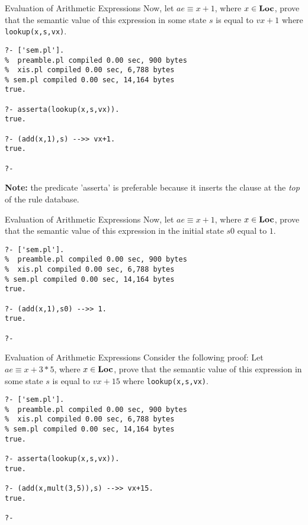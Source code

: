 \documentclass{beamer}
\begin{document}
\begin{frame}[fragile]{Evaluation of Arithmetic Expressions}
\small
Now, let $ae \equiv x + 1$, where $x \in \mbox{\bf Loc}$, prove that the semantic value of this expression in some
state $s$ is equal to $vx +1$ where {\tt lookup(x,s,vx)}.

\begin{verbatim}
?- ['sem.pl'].
%  preamble.pl compiled 0.00 sec, 900 bytes
%  xis.pl compiled 0.00 sec, 6,788 bytes
% sem.pl compiled 0.00 sec, 14,164 bytes
true.

?- asserta(lookup(x,s,vx)).
true.

?- (add(x,1),s) -->> vx+1. 
true.

?- 
\end{verbatim}

{\bf Note:} the predicate 'asserta' is preferable because it inserts the clause at the {\em top} of the rule database.
\end{frame}

\begin{frame}[fragile]{Evaluation of Arithmetic Expressions}
\small
Now, let $ae \equiv x + 1$, where $x \in \mbox{\bf Loc}$, prove that the semantic value of this expression in the initial state
$s0$ equal to $1$.

\begin{verbatim}
?- ['sem.pl'].
%  preamble.pl compiled 0.00 sec, 900 bytes
%  xis.pl compiled 0.00 sec, 6,788 bytes
% sem.pl compiled 0.00 sec, 14,164 bytes
true.

?- (add(x,1),s0) -->> 1.
true.

?- 
\end{verbatim}
\end{frame}

\begin{frame}[fragile]{Evaluation of Arithmetic Expressions}
\scriptsize
Consider the following proof:
Let $ae \equiv x + 3*5$, where $x \in \mbox{\bf Loc}$, prove that the semantic value of this expression in some
state $s$ is equal to $vx + 15$ where {\tt lookup(x,s,vx)}.


\begin{verbatim}
?- ['sem.pl'].
%  preamble.pl compiled 0.00 sec, 900 bytes
%  xis.pl compiled 0.00 sec, 6,788 bytes
% sem.pl compiled 0.00 sec, 14,164 bytes
true.

?- asserta(lookup(x,s,vx)).
true.

?- (add(x,mult(3,5)),s) -->> vx+15.
true.

?- 
\end{verbatim}
\end{frame}
\end{document}
